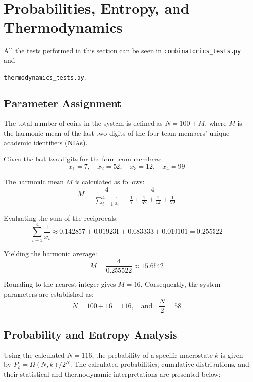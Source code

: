 \documentclass[11pt, a4paper]{article}
\begin{document}
\section{Probabilities, Entropy, and Thermodynamics}
All the tests performed in this section can be seen in \texttt{combinatorics\_tests.py} and

\texttt{thermodynamics\_tests.py}.
\subsection{Parameter Assignment}
The total number of coins in the system is defined as $N = 100 + M$, where $M$ is the harmonic mean of the last two digits of the four team members' unique academic identifiers (NIAs).

Given the last two digits for the four team members:
\begin{equation} x_1 = 7, \quad x_2 = 52, \quad x_3 = 12, \quad x_4 = 99 \end{equation}

The harmonic mean $M$ is calculated as follows:
\begin{equation} M = \frac{4}{\sum_{i=1}^{4} \frac{1}{x_i}} = \frac{4}{\frac{1}{7} + \frac{1}{52} + \frac{1}{12} + \frac{1}{99}} \end{equation}

Evaluating the sum of the reciprocals:
\begin{equation} \sum_{i=1}^{4} \frac{1}{x_i} \approx 0.142857 + 0.019231 + 0.083333 + 0.010101 = 0.255522 \end{equation}

Yielding the harmonic average:
\begin{equation} M = \frac{4}{0.255522} \approx 15.6542 \end{equation}

Rounding to the nearest integer gives $M = 16$. Consequently, the system parameters are established as:
\begin{equation} N = 100 + 16 = 116, \quad \text{and} \quad \frac{N}{2} = 58 \end{equation}

\subsection{Probability and Entropy Analysis}
Using the calculated $N = 116$, the probability of a specific macrostate $k$ is given by $P_k = \Omega(N,k)/2^N$. The calculated probabilities, cumulative distributions, and their statistical and thermodynamic interpretations are presented below:
\end{document}
